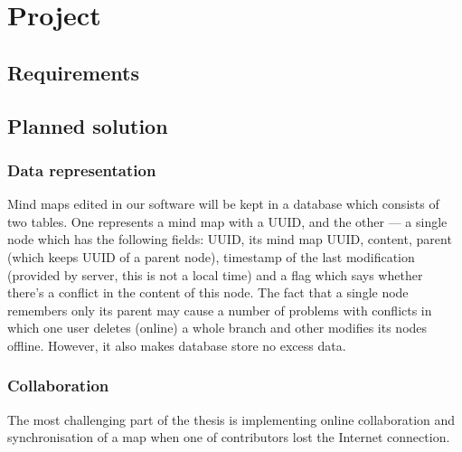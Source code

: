 %
%
%
%
%

\chapter{Project}
\label{chap:project}

\section{Requirements}
\label{sec:requirements}

\section{Planned solution}
\label{sec:plan}

\subsection{Data representation}
\label{subsec:data-repr}

Mind maps edited in our software will be kept in a database which consists of two tables. One represents a mind map with a UUID, and the other --- a single node which has the following fields: UUID, its mind map UUID, content, parent (which keeps UUID of a parent node), timestamp of the last modification (provided by server, this is not a local time) and a flag which says whether there's a conflict in the content of this node. The fact that a single node remembers only its parent may  cause a number of problems with conflicts in which one user deletes (online) a whole branch and other modifies its nodes offline. However, it also makes database store no excess data.

\subsection{Collaboration}
\label{subsec:collaboration}

The most challenging part of the thesis is implementing online collaboration and synchronisation of a map when one of contributors lost the Internet connection.
